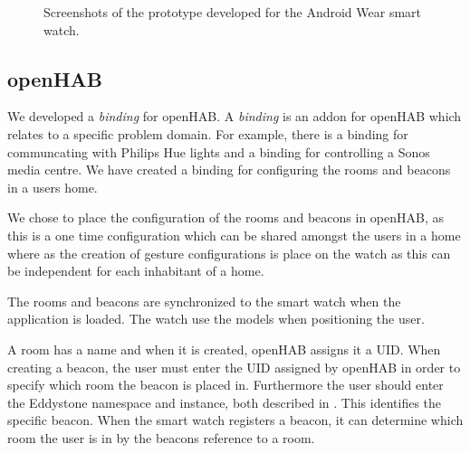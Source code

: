 \begin{figure}[!htb]
{    }
    \caption{Screenshots of the prototype developed for the Android Wear smart watch.}
    \label{fig:implementation:prototype:screenshots}
\end{figure}

\subsection{openHAB}
\label{sec:implementation:prototype:openhab}

We developed a \emph{binding} for openHAB. A \emph{binding} is an addon for openHAB which relates to a specific problem domain. For example, there is a binding for communcating with Philips Hue lights and a binding for controlling a Sonos media centre. We have created a binding for configuring the rooms and beacons in a users home.

We chose to place the configuration of the rooms and beacons in openHAB, as this is a one time configuration which can be shared amongst the users in a home where as the creation of gesture configurations is place on the watch as this can be independent for each inhabitant of a home.

The rooms and beacons are synchronized to the smart watch when the application is loaded. The watch use the models when positioning the user.

A room has a name and when it is created, openHAB assigns it a UID. When creating a beacon, the user must enter the UID assigned by openHAB in order to specify which room the beacon is placed in. Furthermore the user should enter the Eddystone namespace and instance, both described in . This identifies the specific beacon. When the smart watch registers a beacon, it can determine which room the user is in by the beacons reference to a room.

